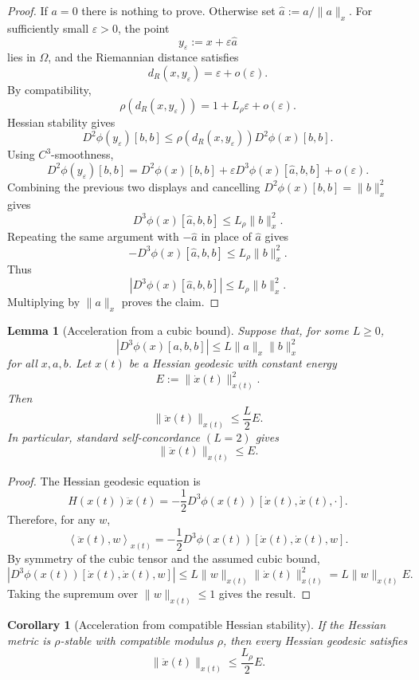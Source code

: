\documentclass[11pt]{article}
\newtheorem{lemma}{Lemma}
\newtheorem{corollary}{Corollary}
\newcommand{\ip}[2]{\left\langle #1,#2\right\rangle}
\begin{document}
\begin{proof}
If \(a=0\) there is nothing to prove.  Otherwise set
\(\hat a:=a/\|a\|_x\).  For sufficiently small \(\varepsilon>0\), the point
\[
    y_\varepsilon:=x+\varepsilon \hat a
\]
lies in \(\Omega\), and the Riemannian distance satisfies
\[
    d_R(x,y_\varepsilon)=\varepsilon+o(\varepsilon).
\]
By compatibility,
\[
    \rho(d_R(x,y_\varepsilon))
    =
    1+L_\rho\varepsilon+o(\varepsilon).
\]
Hessian stability gives
\[
    D^2\phi(y_\varepsilon)[b,b]
    \le
    \rho(d_R(x,y_\varepsilon))D^2\phi(x)[b,b].
\]
Using \(C^3\)-smoothness,
\[
    D^2\phi(y_\varepsilon)[b,b]
    =
    D^2\phi(x)[b,b]
    +
    \varepsilon D^3\phi(x)[\hat a,b,b]
    +o(\varepsilon).
\]
Combining the previous two displays and cancelling \(D^2\phi(x)[b,b]=\|b\|_x^2\)
gives
\[
    D^3\phi(x)[\hat a,b,b]
    \le
    L_\rho\|b\|_x^2.
\]
Repeating the same argument with \(-\hat a\) in place of \(\hat a\) gives
\[
    -D^3\phi(x)[\hat a,b,b]
    \le
    L_\rho\|b\|_x^2.
\]
Thus
\[
    |D^3\phi(x)[\hat a,b,b]|
    \le
    L_\rho\|b\|_x^2.
\]
Multiplying by \(\|a\|_x\) proves the claim.
\end{proof}

\begin{lemma}[Acceleration from a cubic bound]\label{lem:acceleration}
Suppose that, for some \(L\ge0\),
\[
    |D^3\phi(x)[a,b,b]|\le L\|a\|_x\|b\|_x^2
\]
for all \(x,a,b\). Let \(x(t)\) be a Hessian geodesic with constant energy
\[
    E:=\|\dot x(t)\|_{x(t)}^2.
\]
Then
\[
    \|\ddot x(t)\|_{x(t)}\le \frac{L}{2}E.
\]
In particular, standard self-concordance \((L=2)\) gives
\[
    \|\ddot x(t)\|_{x(t)}\le E.
\]
\end{lemma}

\begin{proof}
The Hessian geodesic equation is
\[
    H(x(t))\ddot x(t)
    =-\frac12D^3\phi(x(t))[\dot x(t),\dot x(t),\cdot].
\]
Therefore, for any \(w\),
\[
    \ip{\ddot x(t)}{w}_{x(t)}
    =-\frac12D^3\phi(x(t))[\dot x(t),\dot x(t),w].
\]
By symmetry of the cubic tensor and the assumed cubic bound,
\[
    \left|D^3\phi(x(t))[\dot x(t),\dot x(t),w]\right|
    \le L\|w\|_{x(t)}\|\dot x(t)\|_{x(t)}^2
    =L\|w\|_{x(t)}E.
\]
Taking the supremum over \(\|w\|_{x(t)}\le1\) gives the result.
\end{proof}

\begin{corollary}[Acceleration from compatible Hessian stability]\label{cor:rho-acceleration}
If the Hessian metric is \(\rho\)-stable with compatible modulus \(\rho\), then every
Hessian geodesic satisfies
\[
    \|\ddot x(t)\|_{x(t)}
    \le
    \frac{L_\rho}{2}E.
\]
\end{corollary}
\end{document}
